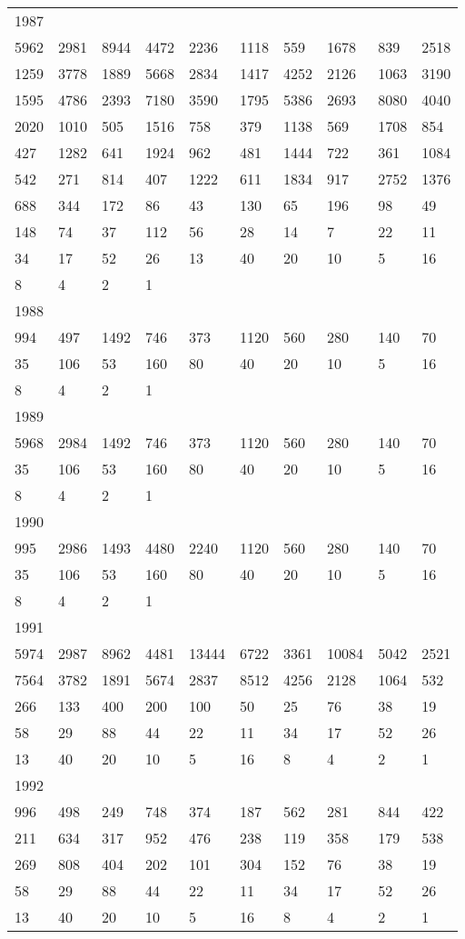 \begin{longtable}{*{10}{l}}
1987&&&&&&&&&\\
5962& 2981& 8944& 4472& 2236& 1118& 559& 1678& 839& 2518\\
1259& 3778& 1889& 5668& 2834& 1417& 4252& 2126& 1063& 3190\\
1595& 4786& 2393& 7180& 3590& 1795& 5386& 2693& 8080& 4040\\
2020& 1010& 505& 1516& 758& 379& 1138& 569& 1708& 854\\
427& 1282& 641& 1924& 962& 481& 1444& 722& 361& 1084\\
542& 271& 814& 407& 1222& 611& 1834& 917& 2752& 1376\\
688& 344& 172& 86& 43& 130& 65& 196& 98& 49\\
148& 74& 37& 112& 56& 28& 14& 7& 22& 11\\
34& 17& 52& 26& 13& 40& 20& 10& 5& 16\\
8& 4& 2& 1& \\

1988&&&&&&&&&\\
994& 497& 1492& 746& 373& 1120& 560& 280& 140& 70\\
35& 106& 53& 160& 80& 40& 20& 10& 5& 16\\
8& 4& 2& 1& \\

1989&&&&&&&&&\\
5968& 2984& 1492& 746& 373& 1120& 560& 280& 140& 70\\
35& 106& 53& 160& 80& 40& 20& 10& 5& 16\\
8& 4& 2& 1& \\

1990&&&&&&&&&\\
995& 2986& 1493& 4480& 2240& 1120& 560& 280& 140& 70\\
35& 106& 53& 160& 80& 40& 20& 10& 5& 16\\
8& 4& 2& 1& \\

1991&&&&&&&&&\\
5974& 2987& 8962& 4481& 13444& 6722& 3361& 10084& 5042& 2521\\
7564& 3782& 1891& 5674& 2837& 8512& 4256& 2128& 1064& 532\\
266& 133& 400& 200& 100& 50& 25& 76& 38& 19\\
58& 29& 88& 44& 22& 11& 34& 17& 52& 26\\
13& 40& 20& 10& 5& 16& 8& 4& 2& 1\\

1992&&&&&&&&&\\
996& 498& 249& 748& 374& 187& 562& 281& 844& 422\\
211& 634& 317& 952& 476& 238& 119& 358& 179& 538\\
269& 808& 404& 202& 101& 304& 152& 76& 38& 19\\
58& 29& 88& 44& 22& 11& 34& 17& 52& 26\\
13& 40& 20& 10& 5& 16& 8& 4& 2& 1\\


\end{longtable}
